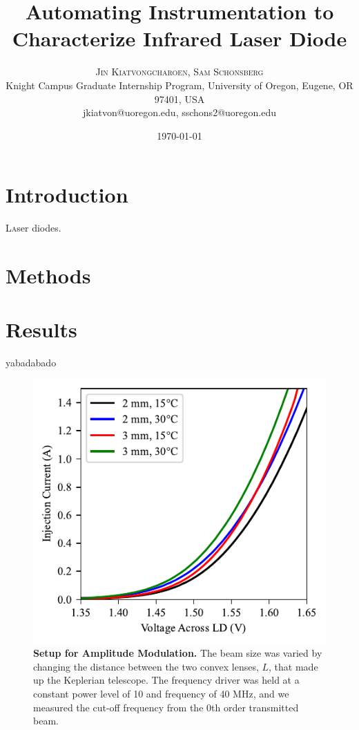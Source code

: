 \documentclass[twoside,twocolumn]{article}
\title{Automating Instrumentation to Characterize Infrared Laser Diode} %
\author{%
\textsc{Jin Kiatvongcharoen, Sam Schonsberg} \\[1ex] %
\normalsize Knight Campus Graduate Internship Program, University of Oregon, Eugene, OR 97401, USA \\ %
\normalsize{jkiatvon@uoregon.edu, sschons2@uoregon.edu} %
}
\date{\today} %
\begin{document}
\maketitle


\section{Introduction}

\lettrine[nindent=0em,lines=3]{L} aser diodes.



\section{Methods}




\section{Results}
yabadabado

\begin{figure}[H]
\centering
\includegraphics[width=1\columnwidth]{../plots/IVcurve.pdf}
\centering\caption{\textbf{Setup for Amplitude Modulation.} The beam size was varied by changing the distance between the two convex lenses, $L$, that made up the Keplerian telescope. The frequency driver was held at a constant power level of 10 and frequency of 40 MHz, and we measured the cut-off frequency from the 0th order transmitted beam.}
\end{figure}
\end{document}
